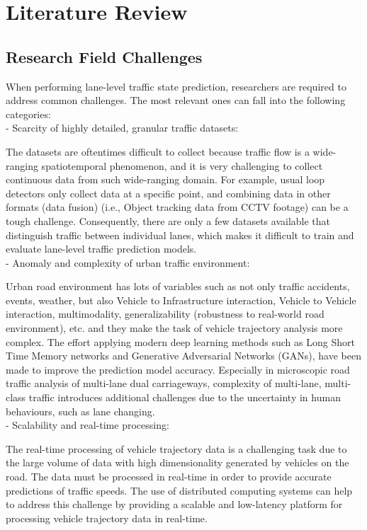 \documentclass[11pt]{uonthesis}
\begin{document}
\chapter{Literature Review}

\section{Research Field Challenges}
When performing lane-level traffic state prediction, researchers are required to address common challenges. The most relevant ones can fall into the following categories:
\\
\noindent- Scarcity of highly detailed, granular traffic datasets:

The datasets are oftentimes difficult to collect because traffic flow is a wide-ranging spatiotemporal phenomenon, and it is very challenging to collect continuous data from such wide-ranging domain\cite{seo2020evaluation}. For example, usual loop detectors only collect data at a specific point, and combining data in other formats (data fusion) (i.e., Object tracking data from CCTV footage) can be a tough challenge. Consequently, there are only a few datasets available that distinguish traffic between individual lanes, which makes it difficult to train and evaluate lane-level traffic prediction models. %
\\
\noident- Anomaly and complexity of urban traffic environment:

Urban road environment has lots of variables such as not only traffic accidents, events, weather, but also Vehicle to Infrastructure interaction, Vehicle to Vehicle interaction, multimodality, generalizability (robustness to real-world road environment), etc. and they make the task of vehicle trajectory analysis more complex. The effort applying modern deep learning methods such as Long Short Time Memory networks and Generative Adversarial Networks (GANs)\cite{rossi2021vehicle}, have been made to improve the prediction model accuracy. Especially in microscopic road traffic analysis of multi-lane dual carriageways, complexity of multi-lane, multi-class traffic introduces additional challenges due to the uncertainty in human behaviours, such as lane changing\cite{DAHIYA2022100066}.
\\
\noident- Scalability and real-time processing:

The real-time processing of vehicle trajectory data is a challenging task due to the large volume of data with high dimensionality generated by vehicles on the road. The data must be processed in real-time in order to provide accurate predictions of traffic speeds. The use of distributed computing systems can help to address this challenge by providing a scalable and low-latency platform for processing vehicle trajectory data in real-time. %
\end{document}
